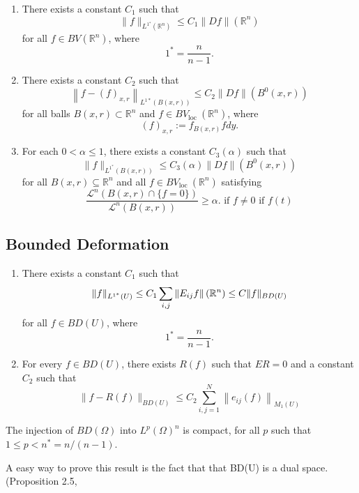 \begin{theorem}\hspace{1cm}

\begin{enumerate}[label=(\roman*)]
\item There exists a constant $C_1$ such that 
$$
\|f\|_{L^{1{ }^*}\left(\mathbb{R}^n\right)} \leq C_1\|D f\|\left(\mathbb{R}^n\right)
$$
for all $f \in B V\left(\mathbb{R}^n\right)$, where
$$
1^*=\frac{n}{n-1} .
$$
\item There exists a constant $C_2$ such that
$$
\left\|f-(f)_{x, r}\right\|_{L^{1 *}(B(x, r))} \leq C_2\|D f\|\left(B^0(x, r)\right)
$$
for all balls $B(x, r) \subset \mathbb{R}^n$ and $f \in B V_{\text {loc }}\left(\mathbb{R}^n\right)$, where
$$
(f)_{x, r}:=f_{B(x, r)} f d y .
$$

\item For each $0<\alpha \leq 1$, there exists a constant $C_3(\alpha)$ such that
$$
\|f\|_{L^{1^*}(B(x, r))} \leq C_3(\alpha)\|D f\|\left(B^0(x, r)\right)
$$
for all $B(x, r) \subseteq \mathbb{R}^n$ and all $f \in B V_{\text {loc }}\left(\mathbb{R}^n\right)$ satisfying $$ \frac{\mathcal{L}^n(B(x, r) \cap\{f=0\})}{\mathcal{L}^n(B(x, r))} \geq \alpha \text {. if } f \neq 0 \text { if } f(t) $$
\end{enumerate}
\end{theorem}
\subsection{Bounded Deformation}
\begin{theorem}\hspace{1cm}

\begin{enumerate}[label=(\roman*)]
\item There exists a constant $C_1$ such that 
$$
\|f\|_{L^{1{ }^*}\left(U\right)} \leq C_1 \sum_ {i,j} \|E_{ij}f\|\left(\mathbb{R}^n\right)\leq C\|f\|_{BD(U)}
$$
for all $f \in B D(U)$, where
$$
1^*=\frac{n}{n-1} .
$$

\item For every $f \in B D(U)$, there exists $R(f)$ such that $ER=0$  and a constant $C_2$ such that
$$
\|f-R(f)\|_{BD(U)} \leq C_2 \sum_{i, j=1}^N\left\|e_{i j}(f)\right\|_{M_1(U)}
$$
\end{enumerate}
\end{theorem}

\begin{theorem}
The injection of $B D(\Omega)$ into $L^p(\Omega)^n$ is compact, for all $p$ such that $1 \leq p<n^*=n /(n-1)$.
\end{theorem}
A easy way to prove this result is the fact that  that BD(U) is a dual space. (Proposition 2.5, \cite{RogerPaper}

